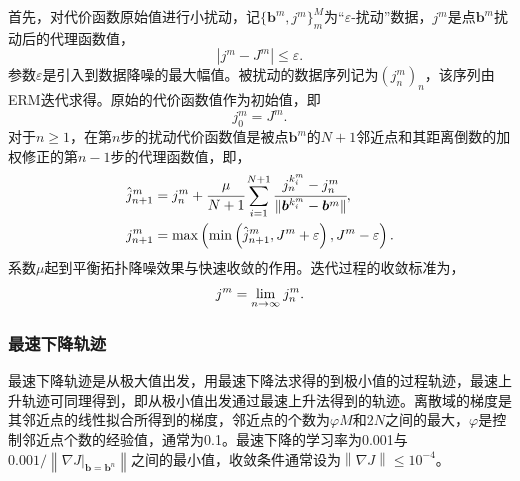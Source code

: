 首先，对代价函数原始值进行小扰动，记$\{\bm{b}^m,j^m\}_m^M$为``$\varepsilon$-扰动''数据，$j^m$是点$\bm{b}^m$扰动后的代理函数值，
\begin{equation}
    |j^m - J^m| \leq \varepsilon.
    \label{Eq:j_epsilon}
\end{equation}
参数$\varepsilon$是引入到数据降噪的最大幅值。被扰动的数据序列记为$(j_n^m)_n$，该序列由ERM迭代求得。原始的代价函数值作为初始值，即
\begin{equation}
    j^m_0  = J^m.
\end{equation}
对于$n \geq 1$，在第$n$步的扰动代价函数值是被点$\bm{b}^m$的$N+1$邻近点和其距离倒数的加权修正的第$n-1$步的代理函数值，即，
\begin{align}
\hat{j}^m_{n+1} & = j^m_n + \cfrac{\mu}{N+1} \sum^{N+1}_{i=1} \cfrac{j^{k^m_i}_n - j^m_n}{\Vert \bm{b}^{k^m_i}-\bm{b}^m \Vert}, \nonumber \\
j^m_{n+1} & =  \max \left( \min \left( \hat{j}^m_{n+1} , J^m + \varepsilon \right),   J^m-\varepsilon  \right). 
\end{align}
系数$\mu$起到平衡拓扑降噪效果与快速收敛的作用。迭代过程的收敛标准为，
\begin{equation}
    j^m = \underset{n \rightarrow  \infty}{\rm lim} \> j^m_n.
\end{equation}

\vspace{0.8em}
\subsubsection{最速下降轨迹}\label{Sec: trajectory}
\vspace{0.8em}

最速下降轨迹是从极大值出发，用最速下降法求得的到极小值的过程轨迹，最速上升轨迹可同理得到，即从极小值出发通过最速上升法得到的轨迹。离散域的梯度是其邻近点的线性拟合所得到的梯度，邻近点的个数为$\varphi  M$和$2N$之间的最大，$\varphi$是控制邻近点个数的经验值，通常为0.1。最速下降的学习率为0.001与$0.001/\left \| \nabla J \vert_{\bm{b}=\bm{b}^n} \right \| $之间的最小值，收敛条件通常设为$\left \| \nabla J  \right \| \le 10^{-4}$。

